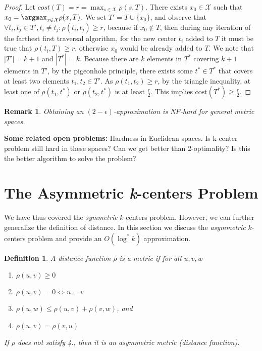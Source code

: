 \documentclass{article}
\newtheorem{definition}{Definition}
\newtheorem{remark}{Remark}
\begin{document}
\begin{proof}
Let $ cost(T) = r = \max_{s \in \mathcal{X}} \rho(s,T) $. There exists
$x_0 \in \mathcal{X}$ such that $x_0 = \argmax_{x \in\mathcal{X}}
\rho(x,T)$. We set $T' = T \cup \{x_0\} $, and observe that $\forall
t_i, t_j \in T', t_i \ne t_j : \rho(t_i,t_j) \ge r$, because if $x_0
\notin T$, then during any iteration of the farthest first traversal
algorithm, for the new center $t_i$ added to $T$ it must be true that
$\rho(t_i, T) \geq r$, otherwise $x_0$ would be already added to $T$.
We note that $|T'| = k+1$ and $ |T^*| = k$. Because there are $k$
elements in $T^*$ covering $k+1$ elements in $T'$, by the pigeonhole
principle, there exists some $t^* \in T^*$ that covers at least two
elements $t_1,t_2 \in T'$. As $\rho(t_1,t_2) \geq r$, by the triangle
inequality, at least one of $\rho(t_1,t^*)$ or $\rho(t_2,t^*)$ is at
least $\frac{r}{2}$. This implies $\mathrm{cost}(T^*)\geq\frac{r}{2}$.
\end{proof}

\begin{remark}
Obtaining an $(2 - \epsilon)$-approximation is NP-hard for general
metric spaces.
\end{remark}

\noindent\textbf{Some related open problems:} Hardness in Euclidean
spaces. Is k-center problem still hard in these spaces? Can we get
better than 2-optimality? Is this the better algorithm to solve the
problem? 


\section{The Asymmetric \emph{k}-centers Problem}

We have thus covered the \emph{symmetric} $k$-centers problem. However, we can further generalize the definition of distance. In this section we discuss the \emph{asymmetric} $k$-centers problem and provide an $O(\log^*k)$ approximation.

\begin{definition}
A distance function $\rho$ is a \emph{metric} if for all $u,v,w$
\begin{enumerate}
    \item $\rho(u,v)\geq0$
    \item $\rho(u,v)=0\iff u=v$
    \item $\rho(u,w)\leq\rho(u,v)+\rho(v,w)$, and
    \item $\rho(u,v)=\rho(v,u)$
\end{enumerate}
If $\rho$ does not satisfy 4., then it is an \emph{asymmetric} metric (distance function).
\end{definition}
\end{document}
